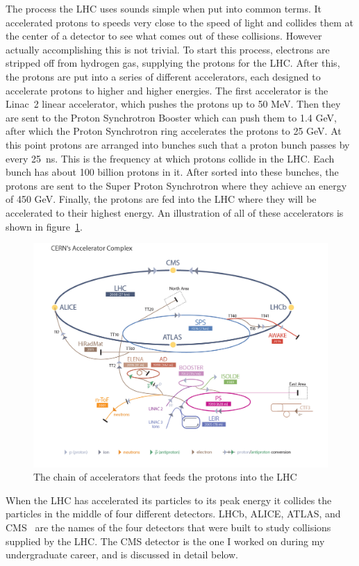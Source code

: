 The process the LHC uses sounds simple when put into common terms. It accelerated protons to speeds very close to the speed of light and collides them at the center of a detector to see what comes out of these collisions. However actually accomplishing this is not trivial. To start this process, electrons are stripped off from hydrogen gas, supplying the protons for the LHC. After this, the protons are put into a series of different accelerators, each designed to accelerate protons to higher and higher energies. The first accelerator is the Linac~2 linear accelerator, which pushes the protons up to 50 MeV. Then they are sent to the Proton Synchrotron Booster which can push them to 1.4 GeV, after which the Proton Synchrotron ring accelerates the protons to 25 GeV. At this point protons are arranged into bunches such that a proton bunch passes by every 25~ns. This is the frequency at which protons collide in the LHC. Each bunch has about 100 billion protons in it. After sorted into these bunches, the protons are sent to the Super Proton Synchrotron where they achieve an energy of 450 GeV. Finally, the protons are fed into the LHC where they will be accelerated to their highest energy. An illustration of all of these accelerators is shown in figure~\ref{fig:acceleratorcomplex}.

\begin{figure}
\centering
\includegraphics[width=0.8\linewidth]{Figures/acceleratorcomplex.jpg}
\caption{The chain of accelerators that feeds the protons into the LHC}
\label{fig:acceleratorcomplex}
\end{figure}

When the LHC has accelerated its particles to its peak energy it collides the particles in the middle of four different detectors. LHCb, ALICE, ATLAS, and CMS~\cite{CMS} are the names of the four detectors that were built to study collisions supplied by the LHC. The CMS detector is the one I worked on during my undergraduate career, and is discussed in detail below.

